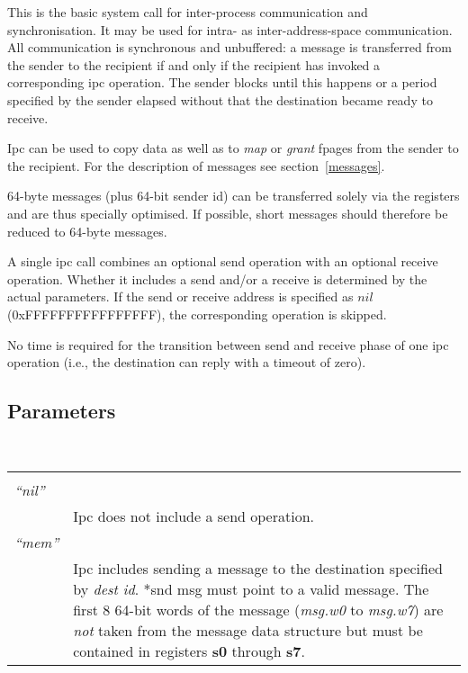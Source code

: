 \documentclass[a4paper,11pt,twoside,dvips]{book}
\makeatletter
\newlength{\Up}\setlength{\Up}{-\baselineskip}
\newlength{\Params}
\newenvironment{param}[1] 
{%
\setlength{\Params}{\textwidth}\addtolength{\Params}{-140pt}%
\par\vspace{5pt}%
\noindent\begin{minipage}{\textwidth} 
\noindent {\em #1}\\[\Up]%
\noindent\begin{tabular}{@{\hspace*{75pt}}lp{\Params}}%
\hspace*{30pt}&\\[\Up]%
} 
{%
\end{tabular}\end{minipage}\par\vspace{5pt}%
}
\newlength{\bboxw}
\newcommand{\reg}[1]{\mbox{\textbf{#1}}}
\newcommand{\abox}[2]{\setlength{\bboxw}{#2pt}\addtolength{\bboxw}{\bboxw}%
\addtolength{\bboxw}{\bboxw}\addtolength{\bboxw}{\bboxw}%
\framebox[\bboxw]{{\footnotesize #1\rule[-1ex]{0pt}{4ex}}}}
\newcommand{\cbox}[3]{\setlength{\bboxw}{#3pt}\addtolength{\bboxw}{\bboxw}%
\addtolength{\bboxw}{\bboxw}\addtolength{\bboxw}{\bboxw}%
\framebox[\bboxw]{{\footnotesize #1$_{\ (#2)}$\rule[-1ex]{0pt}{4ex}}}}
\makeatother
\begin{document}
 
 
 
\noindent This is the basic system call for inter-process communication and
synchronisation. It may
be used for intra- as inter-address-space communication. All
communication is synchronous and unbuffered: a message is transferred from
the sender to the recipient if and only if the recipient has invoked a
corresponding ipc operation. The sender blocks until this happens or
a period specified by the sender elapsed without that the destination
became ready to receive. 
 
Ipc can be used to copy data as well as to {\em map} or {\em grant} fpages
from the sender to the recipient. For the description of messages see
section~\ref{messages}. 
 
64-byte messages (plus 64-bit sender id) can be
transferred solely via the registers and are thus specially optimised. If
possible, short messages should therefore be reduced to 64-byte messages. 
 
\vspace{10pt} 
 
 
\noindent A single ipc call combines an optional send operation with an
optional receive operation. Whether it includes a send and/or
a receive is determined by the actual parameters. If the send or
receive address is specified as $nil$ (0xFFFFFFFFFFFFFFFF), the
corresponding operation is skipped.
 
No time is required for the transition between send and receive phase of one
ipc operation (i.e., the destination can reply with a timeout
of zero). 
 
 
 
\subsection*{Parameters} 
 
\begin{param}{snd descriptor} 
% 
{\em ``nil''}& \cbox{0xFFFFFFFFFFFFFFFF}{64}{32} \\[8pt] 
           &   Ipc does not include a send operation.\\[10pt] 
%
{\em ``mem''}& \cbox{*snd msg/4}{62}{30}\abox{$m$}{1}\abox{$d$}{1} \\[8pt] 
          &    Ipc includes sending a message to the destination
               specified by {\em dest id}. *snd msg must point
               to a valid message. The first 8 64-bit words of the
               message ({\em msg.w0} to {\em msg.w7}) are {\em not}
               taken from the message data structure but must be contained
               in registers \reg{s0} through \reg{s7}. \\[10pt] 
\end{param} 
\end{document}
